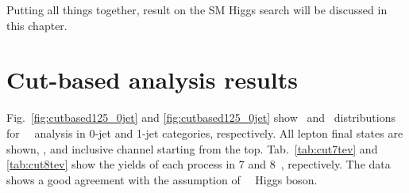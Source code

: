 Putting all things together, result on the SM Higgs search will be discussed in this chapter. 

\section{Cut-based analysis results}  

Fig.~\ref{fig:cutbased125_0jet} and \ref{fig:cutbased125_0jet} show 
\mT\ and \mll\ distributions for ~\GeV\ analysis in 0-jet and 1-jet categories, 
respectively. 
All lepton final states are shown, \DF, \SF and inclusive channel starting from the top. 
Tab.~\ref{tab:cut7tev} and \ref{tab:cut8tev} show the yields of each process in 7 and 8~\TeV, 
repectively.
The data shows a good agreement with the assumption of ~\GeV\ Higgs boson. 

